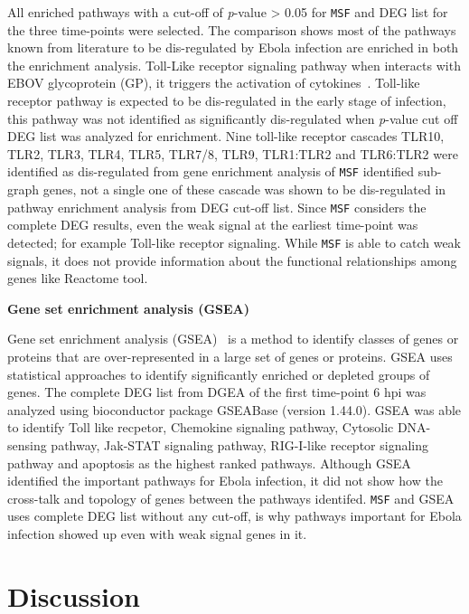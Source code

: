 \documentclass[10pt,a4paper,twocolumn]{article}
\begin{document}
	All enriched pathways with a cut-off of \textit{p}-value > 0.05 for \texttt{MSF} and DEG list for the three time-points were selected. The comparison shows most of the pathways known from literature
	to be dis-regulated by Ebola infection are enriched in both the enrichment
	analysis. Toll-Like receptor signaling pathway when interacts with EBOV
	glycoprotein (GP), it triggers the activation of
	cytokines~\cite{Olejnik}. Toll-like receptor pathway is expected to be dis-regulated in the early stage of infection, this pathway was not identified as significantly dis-regulated when \textit{p}-value
	cut off DEG list was analyzed for enrichment. Nine toll-like receptor cascades TLR10, TLR2, TLR3, TLR4, TLR5, TLR7/8, TLR9, TLR1:TLR2 and TLR6:TLR2 were identified as dis-regulated from gene enrichment analysis of \texttt{MSF} identified sub-graph genes, not a single one of these cascade was shown to be dis-regulated in pathway enrichment analysis from DEG cut-off list. Since \texttt{MSF}
	considers the complete DEG results, even the weak signal at the earliest
	time-point was detected; for example Toll-like receptor signaling. While \texttt{MSF} is able to catch weak signals, it does not provide information about the functional relationships among genes like Reactome tool. 
	
	\textbf{Gene set enrichment analysis (GSEA)}
	
	Gene set enrichment analysis (GSEA)~\cite{Subramanian15545} is a method to identify classes of genes or proteins that are over-represented in a large set of genes or proteins. GSEA uses statistical approaches to identify significantly enriched or depleted groups of genes. The complete DEG list from DGEA of the first time-point 6 hpi was analyzed using bioconductor package GSEABase (version 1.44.0). GSEA was able to identify Toll like recpetor, Chemokine signaling pathway, Cytosolic DNA-sensing pathway, Jak-STAT signaling pathway, RIG-I-like receptor signaling pathway and apoptosis as the highest ranked pathways. Although GSEA identified the important pathways for Ebola infection, it did not show how the cross-talk and topology of genes between the pathways identifed. \texttt{MSF} and GSEA uses complete DEG list without any cut-off, is why pathways important for Ebola infection showed up even with weak signal genes in it.
	
	\section*{Discussion}
	
\end{document}
